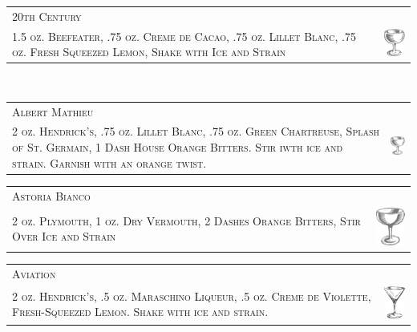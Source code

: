 \documentclass{article}
\begin{document}
\begin{tabular}{b{2.5in} m{0.625in}}
  \multicolumn{2}{p{3.0in}}{\centering\Huge\textsc{20th Century}}\\ 
  \textsc{1.5 oz. Beefeater, .75 oz. Creme de
    Cacao, .75 oz. Lillet Blanc, .75 oz. Fresh Squeezed Lemon, Shake
    with Ice and Strain} &
  \includegraphics[width=0.5in]{coupe.png}
\end{tabular}\\

\begin{tabular}{b{2.5in} m{0.625in}}
  \multicolumn{2}{p{3.0in}}{\centering\Huge\textsc{Albert Mathieu}} \\ 
  \textsc{2 oz. Hendrick's, .75 oz. Lillet Blanc, .75 oz. Green Chartreuse, 
  Splash of St. Germain, 1 Dash House Orange Bitters. 
  Stir iwth ice and strain. Garnish with an orange twist.} &
  \includegraphics[width=0.5in]{coupe.png}
\end{tabular}

\begin{tabular}{b{2.5in} m{0.625in}}
  \multicolumn{2}{p{3.0in}}{\centering\Huge\textsc{Astoria Bianco}} \\ 
  \textsc{2 oz. Plymouth, 1 oz. Dry Vermouth, 2
  Dashes Orange Bitters, Stir Over Ice and Strain} &
  \includegraphics[width=0.5in]{egg_coupe.png}
\end{tabular}

\begin{tabular}{b{2.5in} m{0.625in}}
  \multicolumn{2}{p{3.0in}}{\centering\Huge\textsc{Aviation}} \\ 
  \textsc{2 oz. Hendrick's, .5 oz. Maraschino Liqueur, .5 oz.
  Creme de Violette, Fresh-Squeezed Lemon. Shake with ice and strain.} &
  \includegraphics[width=0.5in]{goblet.png}
\end{tabular}
\end{document}
